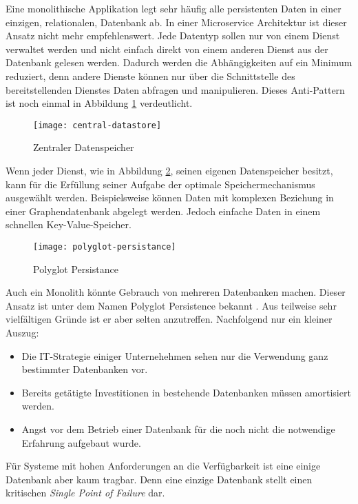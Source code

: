 Eine monolithische Applikation legt sehr häufig alle persistenten Daten in einer einzigen, \zB relationalen, Datenbank ab. In einer Microservice Architektur ist dieser Ansatz nicht mehr empfehlenswert. Jede Datentyp sollen nur von einem Dienst verwaltet werden und nicht einfach direkt von einem anderen Dienst aus der Datenbank gelesen werden. Dadurch werden die Abhängigkeiten auf ein Minimum reduziert, denn andere Dienste können nur über die Schnittstelle des bereitstellenden Dienstes Daten abfragen und manipulieren. Dieses Anti-Pattern ist noch einmal in Abbildung \ref{fig:central-datastore} verdeutlicht.

\begin{figure}[h]
  \centering
	\texttt{[image: central-datastore]}
	\caption{Zentraler Datenspeicher}
	\label{fig:central-datastore}
\end{figure}

Wenn jeder Dienst, wie in Abbildung \ref{fig:polyglot-persistnace}, seinen eigenen Datenspeicher besitzt, kann für die Erfüllung seiner Aufgabe der optimale Speichermechanismus ausgewählt werden. Beispielsweise können Daten mit komplexen Beziehung in einer Graphendatenbank abgelegt werden. Jedoch einfache Daten in einem schnellen Key-Value-Speicher.

\begin{figure}[h]
  \centering
	\texttt{[image: polyglot-persistance]}
	\caption{Polyglot Persistance}
	\label{fig:polyglot-persistnace}
\end{figure}

Auch ein Monolith könnte Gebrauch von mehreren Datenbanken machen. Dieser Ansatz ist unter dem Namen Polyglot Persistence bekannt \cite{FowlerPP}. Aus teilweise sehr vielfältigen Gründe ist er aber selten anzutreffen. Nachfolgend nur ein kleiner Auszug:

\begin{itemize}
  \item Die IT-Strategie einiger Unternehehmen sehen nur die Verwendung ganz bestimmter Datenbanken vor.
	\item Bereits getätigte Investitionen in bestehende Datenbanken müssen amortisiert werden.
	\item Angst vor dem Betrieb einer Datenbank für die noch nicht die notwendige Erfahrung aufgebaut wurde.
\end{itemize}

Für Systeme mit hohen Anforderungen an die Verfügbarkeit ist eine einige Datenbank aber kaum tragbar. Denn eine einzige Datenbank stellt einen kritischen \textit{Single Point of Failure} dar.

